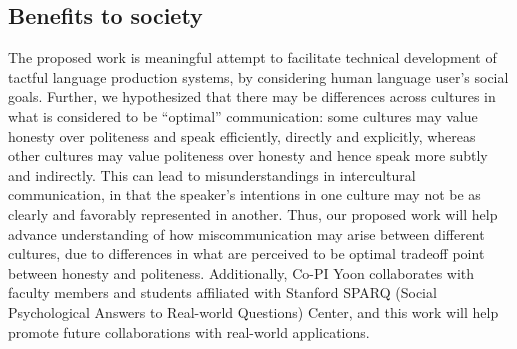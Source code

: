 \subsection{Benefits to society}
The proposed work is meaningful attempt to facilitate technical development of tactful language production systems, by considering human language user's social goals. Further, we hypothesized that there may be differences across cultures in what is considered to be ``optimal'' communication: some cultures may value honesty over politeness and speak efficiently, directly and explicitly, whereas other cultures may value politeness over honesty and hence speak more subtly and indirectly. This can lead to misunderstandings in intercultural communication, in that the speaker's intentions in one culture may not be as clearly and favorably represented in another. Thus, our proposed work will help advance understanding of how miscommunication may arise between different cultures, due to differences in what are perceived to be optimal tradeoff point between honesty and politeness. Additionally, Co-PI Yoon collaborates with faculty members and students affiliated with Stanford SPARQ (Social Psychological Answers to Real-world Questions) Center, and this work will help promote future collaborations with real-world applications.
